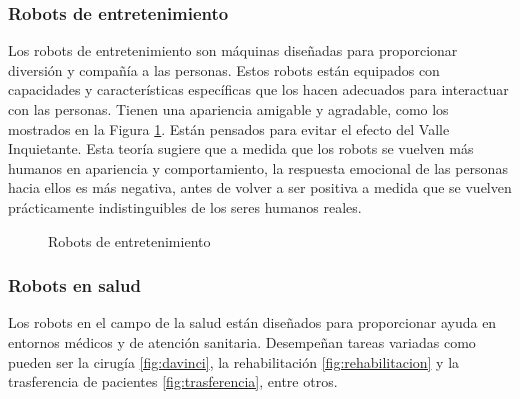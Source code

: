 \subsubsection{Robots de entretenimiento}
Los robots de entretenimiento son máquinas diseñadas para proporcionar diversión y compañía a las personas. Estos robots están equipados con capacidades y 
características específicas que los hacen adecuados para interactuar con las personas. Tienen una apariencia amigable y agradable, como los mostrados 
en la Figura \ref{fig:entretenimiento}. Están pensados para 
evitar el efecto del Valle Inquietante. Esta teoría sugiere que a medida que los robots se vuelven más humanos en apariencia y comportamiento, la respuesta 
emocional de las personas hacia ellos es más negativa, antes de volver a ser positiva a medida que se vuelven prácticamente 
indistinguibles de los seres humanos reales.
\begin{figure} [ht!]
  \centering    
  \hspace{1cm}
  \caption{Robots de entretenimiento}
  \label{fig:entretenimiento}
\end{figure}

\subsubsection{Robots en salud}
Los robots en el campo de la salud están diseñados para proporcionar ayuda en entornos médicos y de atención sanitaria. Desempeñan tareas 
variadas como pueden ser la cirugía \ref{fig:davinci}, la rehabilitación \ref{fig:rehabilitacion} y la trasferencia de pacientes \ref{fig:trasferencia}, entre otros.

